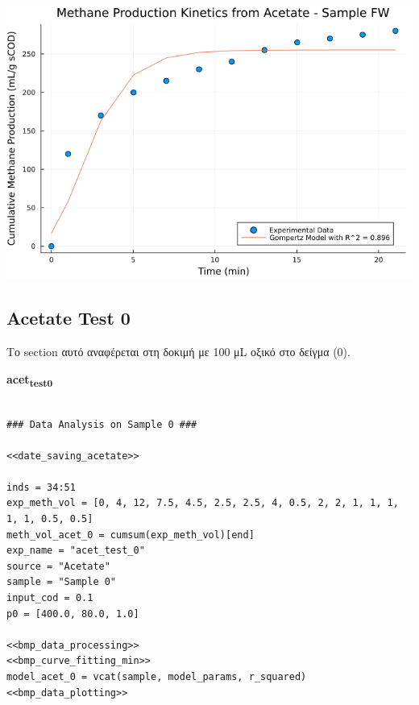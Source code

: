 \documentclass[11pt]{article}
\begin{document}
\begin{center}
\includegraphics[width=.9\linewidth]{../plots/BMPs/Acetate/methane_kinetics_acet_test_fw.png}
\end{center}

\subsection{Acetate Test 0}
\label{sec:org48bc5a8}
Το section αυτό αναφέρεται στη δοκιμή με 100 μL οξικό στο δείγμα (0).

\textbf{acet\textsubscript{test}\textsubscript{0}}
\begin{verbatim}

### Data Analysis on Sample 0 ###

<<date_saving_acetate>>

inds = 34:51
exp_meth_vol = [0, 4, 12, 7.5, 4.5, 2.5, 2.5, 4, 0.5, 2, 2, 1, 1, 1, 1, 1, 0.5, 0.5]
meth_vol_acet_0 = cumsum(exp_meth_vol)[end]
exp_name = "acet_test_0"
source = "Acetate"
sample = "Sample 0"
input_cod = 0.1
p0 = [400.0, 80.0, 1.0]

<<bmp_data_processing>>
<<bmp_curve_fitting_min>>
model_acet_0 = vcat(sample, model_params, r_squared)
<<bmp_data_plotting>>
\end{verbatim}
\end{document}
